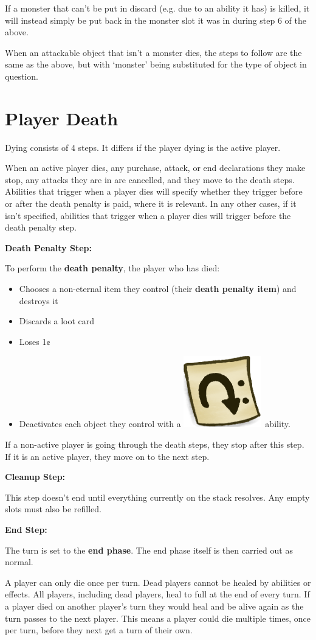 \documentclass[a4paper, twoside]{report} %
\newcommand{\tap}{\includegraphics[scale=0.1]{./assets/Tag_Tap.png}}
\begin{document}
    If a monster that can’t be put in discard (e.g. due to an ability it has) is killed, it will instead simply be put back in the monster slot it was in during step 6 of the above.

    When an attackable object that isn’t a monster dies, the steps to follow are the same as the above, but with ‘monster’ being substituted for the type of object in question.

    \section{Player Death}
    Dying consists of 4 steps. It differs if the player dying is the active player.

    When an active player dies, any purchase, attack, or end declarations they make stop, any attacks they are in are cancelled, and they move to the death steps. Abilities that trigger when a player dies will specify whether they trigger before or after the death penalty is paid, where it is relevant. In any other cases, if it isn’t specified, abilities that trigger when a player dies will trigger before the death penalty step.

    \textbf{Death Penalty Step:}

    To perform the \textbf{death penalty}, the player who has died:
    \begin{itemize}
        \item Chooses a non-eternal item they control (their \textbf{death penalty item}) and destroys it
        \item Discards a loot card
        \item Loses 1¢
        \item Deactivates each object they control with a \tap\ ability.
    \end{itemize}
    If a non-active player is going through the death steps, they stop after this step. If it is an active player, they move on to the next step.

    \textbf{Cleanup Step:}

    This step doesn’t end until everything currently on the stack resolves. Any empty slots must also be refilled.

    \textbf{End Step:}

    The turn is set to the \textbf{end phase}. The end phase itself is then carried out as normal.

    A player can only die once per turn. Dead players cannot be healed by abilities or effects. All players, including dead players, heal to full at the end of every turn. If a player died on another player’s turn they would heal and be alive again as the turn passes to the next player. This means a player could die multiple times, once per turn, before they next get a turn of their own.
\end{document}
